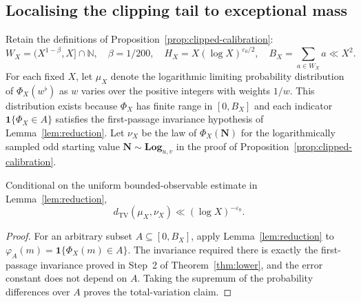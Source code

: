 \subsection*{Localising the clipping tail to exceptional mass}
\label{subsec:exceptional-mass}
Retain the definitions of Proposition~\ref{prop:clipped-calibration}:
\[
 W_X=(X^{1-\beta},X]\cap\mathbb N,\quad
 \beta=1/200,\quad H_X=X(\log X)^{\varepsilon_0/2},
 \quad B_X=\sum_{a\in W_X}a\ll X^2.
\]
For each fixed $X$, let $\mu_X$ denote the logarithmic limiting
probability distribution of $\Phi_X(w^\flat)$ as $w$ varies over the
positive integers with weights $1/w$. This distribution exists because
$\Phi_X$ has finite range in $[0,B_X]$ and each indicator
$\mathbf1\{\Phi_X\in A\}$ satisfies the first-passage invariance
hypothesis of Lemma~\ref{lem:reduction}. Let $\nu_X$ be the law of
$\Phi_X(\mathbf N)$ for the logarithmically sampled odd starting value
$\mathbf N\sim\mathbf{Log}_{u,v}$ in the proof of
Proposition~\ref{prop:clipped-calibration}.

\begin{lemma}
\label{lem:distributional-reduction}
Conditional on the uniform bounded-observable estimate in
Lemma~\ref{lem:reduction},
\[
 d_{\mathrm{TV}}(\mu_X,\nu_X)
 \ll(\log X)^{-\varepsilon_0}.
\]
\end{lemma}
\begin{proof}
For an arbitrary subset $A\subseteq[0,B_X]$, apply
Lemma~\ref{lem:reduction} to
$\varphi_A(m)=\mathbf1\{\Phi_X(m)\in A\}$. The invariance required
there is exactly the first-passage invariance proved in Step~2 of
Theorem~\ref{thm:lower}, and the error constant does not depend on $A$.
Taking the supremum of the probability differences over $A$ proves
the total-variation claim.
\end{proof}

